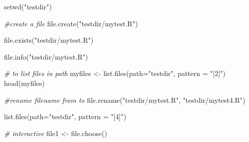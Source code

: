 \documentclass[
]{book}
\newenvironment{Shaded}{\begin{snugshade}}{\end{snugshade}}
\newcommand{\AttributeTok}[1]{\textcolor[rgb]{0.77,0.63,0.00}{#1}}
\newcommand{\CommentTok}[1]{\textcolor[rgb]{0.56,0.35,0.01}{\textit{#1}}}
\newcommand{\FunctionTok}[1]{\textcolor[rgb]{0.00,0.00,0.00}{#1}}
\newcommand{\NormalTok}[1]{#1}
\newcommand{\OtherTok}[1]{\textcolor[rgb]{0.56,0.35,0.01}{#1}}
\newcommand{\StringTok}[1]{\textcolor[rgb]{0.31,0.60,0.02}{#1}}
\begin{document}
\begin{Shaded}
\begin{Highlighting}[]
\FunctionTok{setwd}\NormalTok{(}\StringTok{"testdir"}\NormalTok{)}
\end{Highlighting}
\end{Shaded}

\begin{Shaded}
\begin{Highlighting}[]
\CommentTok{\#create a file}
\FunctionTok{file.create}\NormalTok{(}\StringTok{"testdir/mytest.R"}\NormalTok{)}
\end{Highlighting}
\end{Shaded}

\begin{Shaded}
\begin{Highlighting}[]
\FunctionTok{file.exists}\NormalTok{(}\StringTok{"testdir/mytest.R"}\NormalTok{)}
\end{Highlighting}
\end{Shaded}

\begin{Shaded}
\begin{Highlighting}[]
\FunctionTok{file.info}\NormalTok{(}\StringTok{"testdir/mytest.R"}\NormalTok{)}
\end{Highlighting}
\end{Shaded}

\begin{Shaded}
\begin{Highlighting}[]
\CommentTok{\# to list files in path}
\NormalTok{myfiles }\OtherTok{\textless{}{-}} \FunctionTok{list.files}\NormalTok{(}\AttributeTok{path=}\StringTok{"testdir"}\NormalTok{, }\AttributeTok{pattern =} \StringTok{"[2]"}\NormalTok{)}
\FunctionTok{head}\NormalTok{(myfiles)}
\end{Highlighting}
\end{Shaded}

\begin{Shaded}
\begin{Highlighting}[]
\CommentTok{\#rename filename from to}
\FunctionTok{file.rename}\NormalTok{(}\StringTok{"testdir/mytest.R"}\NormalTok{, }\StringTok{"testdir/mytest4.R"}\NormalTok{)}

\FunctionTok{list.files}\NormalTok{(}\AttributeTok{path=}\StringTok{"testdir"}\NormalTok{, }\AttributeTok{pattern =} \StringTok{"[4]"}\NormalTok{)}
\end{Highlighting}
\end{Shaded}

\begin{Shaded}
\begin{Highlighting}[]
\CommentTok{\# interactive}
\NormalTok{ file1 }\OtherTok{\textless{}{-}} \FunctionTok{file.choose}\NormalTok{()}
\end{Highlighting}
\end{Shaded}
\end{document}
